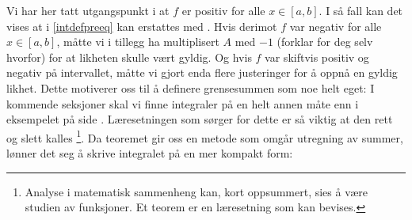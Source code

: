 Vi har her tatt utgangspunkt i at $f$ er positiv for alle $x\in[a, b]$. I så fall kan det vises at \sym{$\approx$} i \eqref{intdefpreeq} kan erstattes med \sym{$=$}. Hvis derimot $f$ var negativ for alle $x\in[a, b]$, måtte vi i tillegg ha multiplisert $A$ med $-1$ (forklar for deg selv hvorfor) for at likheten skulle vært gyldig. Og hvis $f$ var skiftvis positiv og negativ på intervallet, måtte vi gjort enda flere justeringer for å oppnå en gyldig likhet. Dette motiverer oss til å definere grensesummen som noe helt eget:
\newpage
{}
\newpage
I kommende seksjoner skal vi finne integraler på en helt annen måte enn i eksempelet på side \pageref{eksfinnint}. Læresetningen som sørger for dette er så viktig at den rett og slett kalles \footnote{Analyse i matematisk sammenheng kan, kort oppsummert, sies å være studien av funksjoner. Et teorem er en læresetning som kan bevises.}. Da teoremet gir oss en metode som omgår utregning av summer, lønner det seg å skrive integralet på en mer kompakt form:\regv
{}
\label{bestmintend}

